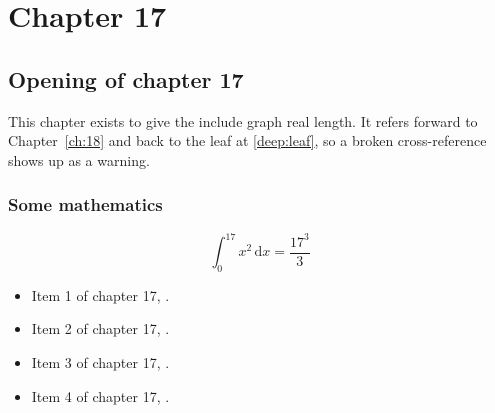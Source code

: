 \chapter{Chapter 17}
\label{ch:17}
\section{Opening of chapter 17}
This chapter exists to give the include graph real length. It refers
forward to Chapter~\ref{ch:18} and back to the leaf
at \ref{deep:leaf}, so a broken cross-reference shows up as a warning.

\subsection{Some mathematics}
\begin{equation}
  \int_0^{17} x^{2} \, \mathrm{d}x = \frac{17^{3}}{3}
\end{equation}

\begin{itemize}
  \item Item 1 of chapter 17, .
  \item Item 2 of chapter 17, .
  \item Item 3 of chapter 17, .
  \item Item 4 of chapter 17, .
\end{itemize}
